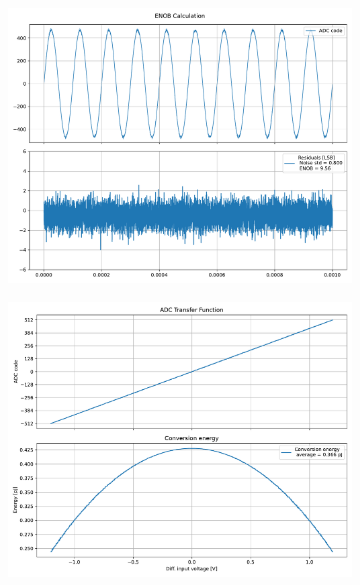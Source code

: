 \documentclass[varwidth]{standalone}
\begin{document}
\begin{figure}
\begin{subfigure}{0.32\textwidth}
    \includegraphics[width=\textwidth]{behavioral_10b_mismatch_enob.pdf}
\end{subfigure}
\begin{subfigure}{0.32\textwidth}
    \begin{table}
    \let\center\empty
    \let\endcenter\relax
    \centering
    \resizebox{0.3\width}{!}{}
    \end{table}
    \includegraphics[width=\textwidth]{behavioral_10b_mismatch_energy.pdf}
\end{subfigure}
\end{figure}
\end{document}
